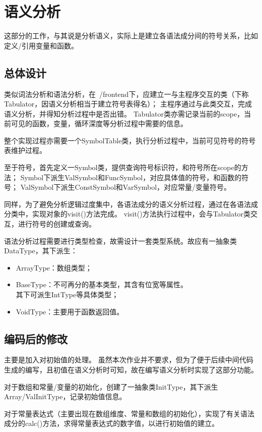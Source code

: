 \section{语义分析}

这部分的工作，与其说是分析语义，实际上是建立各语法成分间的符号关系，比如定义/引用变量和函数。

\subsection{总体设计}

类似词法分析和语法分析，在~/frontend下，应建立一与主程序交互的类（下称Tabulator，因语义分析相当于建立符号表得名）；
主程序通过与此类交互，完成语义分析，并得知分析过程中是否出错。
Tabulator类亦需记录当前的scope，当前可见的函数，变量，循环深度等分析过程中需要的信息。

整个实现过程亦需要一个SymbolTable类，执行分析过程中，当前可见符号的符号表维护过程。

至于符号，首先定义一Symbol类，提供查询符号标识符，和符号所在scope的方法；
Symbol下派生ValSymbol和FuncSymbol，对应具体值的符号，和函数的符号；
ValSymbol下派生ConstSymbol和VarSymbol，对应常量/变量符号。

同样，为了避免分析逻辑过度集中，各语法成分的语义分析过程，通过在各语法成分类中，实现对象的visit()方法完成。
visit()方法执行过程中，会与Tabulator类交互，进行符号的创建或查询。

语法分析过程需要进行类型检查，故需设计一套类型系统。故应有一抽象类DataType，其下派生：
\begin{itemize}
    \item ArrayType：数组类型；
    \item BaseType：不可再分的基本类型，其含有位宽等属性。\\其下可派生IntType等具体类型；
    \item VoidType：主要用于函数返回值。
\end{itemize}

\subsection{编码后的修改}

主要是加入对初始值的处理。
虽然本次作业并不要求，但为了便于后续中间代码生成的编写，且初值在语义分析时可知，故在编写语义分析时实现了这部分功能。

对于数组和常量/变量的初始化，创建了一抽象类InitType，其下派生Array/ValInitType，记录初始值信息。

对于常量表达式（主要出现在数组维度、常量和数组的初始化），实现了有关语法成分的calc()方法，求得常量表达式的数字值，以进行初始值的建立。